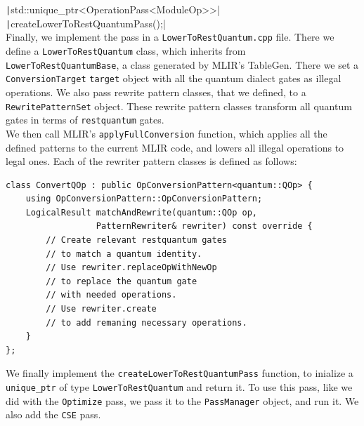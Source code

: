 \texttt|std::unique_ptr<OperationPass<ModuleOp>>|\\
\texttt|createLowerToRestQuantumPass();| \\Finally, we implement the pass in a
\texttt{LowerToRestQuantum.cpp} file. There we define a
\texttt{LowerToRestQuantum} class, which inherits from
\texttt{LowerToRestQuantumBase}, a class generated by MLIR's TableGen. There we
set a \texttt{ConversionTarget} \texttt{target} object with all the quantum
dialect gates as illegal operations. We also pass rewrite pattern classes, that
we defined, to  a \texttt{RewritePatternSet} object. These rewrite pattern
classes transform all quantum gates in terms of \texttt{restquantum} gates.\\ 
We then call MLIR's \texttt{applyFullConversion} function, which applies all the
defined patterns to the current MLIR code, and lowers all illegal operations to
legal ones. Each of the rewriter pattern classes is defined as follows:
\begin{verbatim}
class ConvertQOp : public OpConversionPattern<quantum::QOp> { 
    using OpConversionPattern::OpConversionPattern; 
    LogicalResult matchAndRewrite(quantum::QOp op, 
                  PatternRewriter& rewriter) const override { 
        // Create relevant restquantum gates 
        // to match a quantum identity.
        // Use rewriter.replaceOpWithNewOp 
        // to replace the quantum gate
        // with needed operations.
        // Use rewriter.create 
        // to add remaning necessary operations.
    } 
};
\end{verbatim}

We finally implement the \texttt{createLowerToRestQuantumPass} function, 
to inialize a \texttt{unique\_ptr}  of type \texttt{LowerToRestQuantum} and return it.
To use this pass, like we did with the \texttt{Optimize} pass, we pass it 
to the \texttt{PassManager} object, and run it. We also add the \texttt{CSE} pass.

